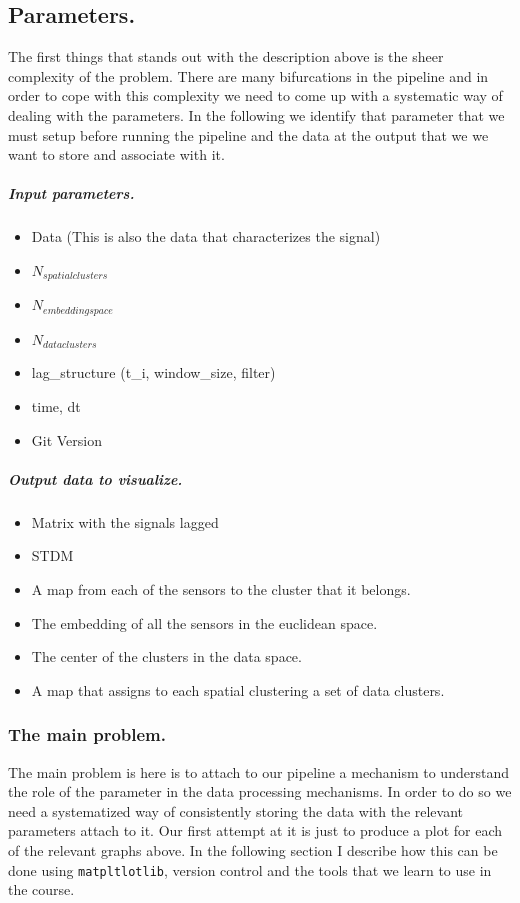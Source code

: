 \documentclass[11pt,a4paper]{article}
\begin{document}
\subsection{Parameters.}\label{parameters.}

The first things that stands out with the description above is the sheer
complexity of the problem. There are many bifurcations in the pipeline
and in order to cope with this complexity we need to come up with a
systematic way of dealing with the parameters. In the following we
identify that parameter that we must setup before running the pipeline
and the data at the output that we we want to store and associate with
it.

\subparagraph{Input parameters.}\label{input-parameters.}

\begin{itemize}
\item
  Data (This is also the data that characterizes the signal)
\item
  \(N_{spatial clusters}\)
\item
  \(N_{embedding space}\)
\item
  \(N_{data clusters}\)
\item
  lag\_structure (t\_i, window\_size, filter)
\item
  time, dt
\item
  Git Version
\end{itemize}

\subparagraph{Output data to
visualize.}\label{output-data-to-visualize.}

\begin{itemize}
\item
  Matrix with the signals lagged
\item
  STDM
\item
  A map from each of the sensors to the cluster that it belongs.
\item
  The embedding of all the sensors in the euclidean space.
\item
  The center of the clusters in the data space.
\item
  A map that assigns to each spatial clustering a set of data clusters.
\end{itemize}

\subsubsection{The main problem.}\label{the-main-problem.}

The main problem is here is to attach to our pipeline a mechanism to
understand the role of the parameter in the data processing mechanisms.
In order to do so we need a systematized way of consistently storing the
data with the relevant parameters attach to it. Our first attempt at it
is just to produce a plot for each of the relevant graphs above. In the
following section I describe how this can be done using
\texttt{matpltlotlib}, version control and the tools that we learn to
use in the course.
\end{document}
